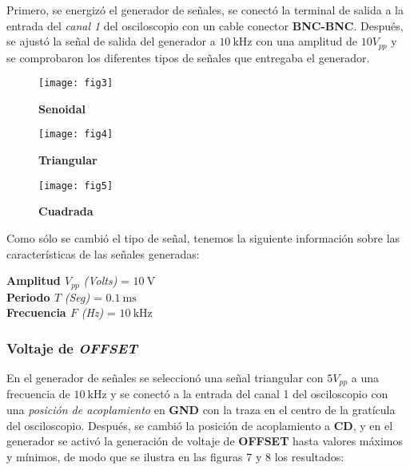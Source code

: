 \documentclass[a4paper,12pt]{article}
\begin{document}
Primero, se energizó el generador de señales, se conectó la terminal de salida a la entrada del \emph{canal 1} del osciloscopio con un cable conector \textbf{BNC-BNC}. Después, se ajustó la señal de salida del generador a $\SI{10}{\kHz}$ con una amplitud de $10V_{pp}$ y se comprobaron los diferentes tipos de señales que entregaba el generador.

\vspace{.5cm}

\begin{figure}[h!]
	\begin{multicols}{3}
	\centering

		\texttt{[image: fig3]}
		\caption{\textbf{Senoidal}}

	\columnbreak

		\texttt{[image: fig4]}
		\caption{\textbf{Triangular}}

	\columnbreak

		\texttt{[image: fig5]}
		\caption{\textbf{Cuadrada}}


	\end{multicols}
\end{figure}

Como sólo se cambió el tipo de señal, tenemos la siguiente información sobre las características de las señales generadas:



\begin{center}
	\textbf{Amplitud $V_{pp}$} \emph{(Volts)}  = $\SI{10}{\volt}$ \\
	\textbf{Periodo $T$} \emph{(Seg)}  = $\SI{0.1}{\milli\second}$ \\
	\textbf{Frecuencia $F$} \emph{(Hz)}  = $\SI{10}{\kHz}$
\end{center}

\newpage

\subsubsection{Voltaje de \emph{OFFSET}}

En el generador de señales se seleccionó una señal triangular con $5 V_{pp}$ a una frecuencia de $\SI{10}{\kHz}$ y se conectó a la entrada del canal 1 del osciloscopio con una \emph{posición de acoplamiento} en \textbf{GND} con la traza en el centro de la gratícula del osciloscopio. Después, se cambió la posición de acoplamiento a \textbf{CD}, y en el generador se activó la generación de voltaje de \textbf{OFFSET} hasta valores máximos y mínimos, de modo que se ilustra en las figuras 7 y 8 los resultados:
\end{document}
